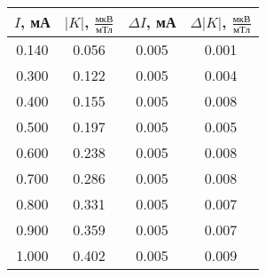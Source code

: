 \begin{tabular}{cccc}
\toprule
$I$, мА & $|K|$, $\frac{\text{мкВ}}{\text{мТл}}$ & $\Delta I$, мА & $\Delta |K|$, $\frac{\text{мкВ}}{\text{мТл}}$ \\
\midrule
0.140 & 0.056 & 0.005 & 0.001 \\
0.300 & 0.122 & 0.005 & 0.004 \\
0.400 & 0.155 & 0.005 & 0.008 \\
0.500 & 0.197 & 0.005 & 0.005 \\
0.600 & 0.238 & 0.005 & 0.008 \\
0.700 & 0.286 & 0.005 & 0.008 \\
0.800 & 0.331 & 0.005 & 0.007 \\
0.900 & 0.359 & 0.005 & 0.007 \\
1.000 & 0.402 & 0.005 & 0.009 \\
\bottomrule
\end{tabular}
